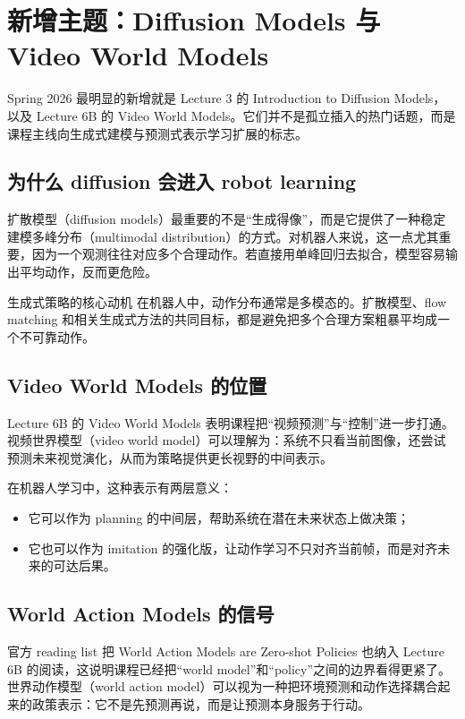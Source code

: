 \documentclass[a4paper]{article}
\begin{document}
\section{新增主题：Diffusion Models 与 Video World Models}

Spring 2026 最明显的新增就是 Lecture 3 的 Introduction to Diffusion Models，以及 Lecture 6B 的 Video World Models。它们并不是孤立插入的热门话题，而是课程主线向生成式建模与预测式表示学习扩展的标志。

\subsection{为什么 diffusion 会进入 robot learning}

扩散模型（diffusion models）最重要的不是“生成得像”，而是它提供了一种稳定建模多峰分布（multimodal distribution）的方式。对机器人来说，这一点尤其重要，因为一个观测往往对应多个合理动作。若直接用单峰回归去拟合，模型容易输出平均动作，反而更危险。

\begin{importantbox}{生成式策略的核心动机}
在机器人中，动作分布通常是多模态的。扩散模型、flow matching 和相关生成式方法的共同目标，都是避免把多个合理方案粗暴平均成一个不可靠动作。
\end{importantbox}

\subsection{Video World Models 的位置}

Lecture 6B 的 Video World Models 表明课程把“视频预测”与“控制”进一步打通。视频世界模型（video world model）可以理解为：系统不只看当前图像，还尝试预测未来视觉演化，从而为策略提供更长视野的中间表示。

在机器人学习中，这种表示有两层意义：
\begin{itemize}
  \item 它可以作为 planning 的中间层，帮助系统在潜在未来状态上做决策；
  \item 它也可以作为 imitation 的强化版，让动作学习不只对齐当前帧，而是对齐未来的可达后果。
\end{itemize}

\subsection{World Action Models 的信号}

官方 reading list 把 World Action Models are Zero-shot Policies 也纳入 Lecture 6B 的阅读，这说明课程已经把“world model”和“policy”之间的边界看得更紧了。世界动作模型（world action model）可以视为一种把环境预测和动作选择耦合起来的政策表示：它不是先预测再说，而是让预测本身服务于行动。
\end{document}
